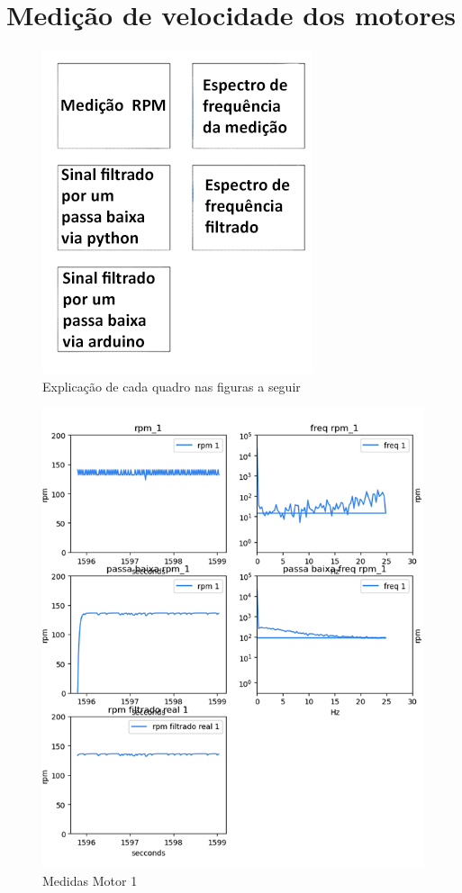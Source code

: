 \chapter{Medição de velocidade dos motores}
\label{att_medicao_motores}

\begin{figure}[h]
	\centering
	\includegraphics{figures/explicacao_quadros}
	\caption{Explicação de cada quadro nas figuras a seguir}
	\label{fig:explicacao_quadros}
\end{figure}


\begin{figure}[h]
	\centering
	\includegraphics{figures/medidas_motor_1}
	\caption{Medidas Motor 1}
	\label{fig:medidas_motor_1}
\end{figure}

